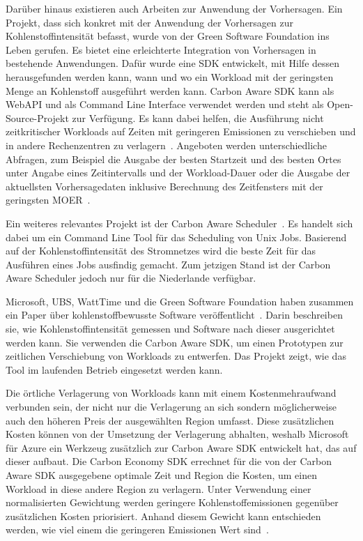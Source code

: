 Darüber hinaus existieren auch Arbeiten zur Anwendung der Vorhersagen.
Ein Projekt, dass sich konkret mit der Anwendung der Vorhersagen zur Kohlenstoffintensität befasst, wurde von der Green Software Foundation ins Leben gerufen.
Es bietet eine erleichterte Integration von Vorhersagen in bestehende Anwendungen.
Dafür wurde eine \ac{SDK} entwickelt, mit Hilfe dessen herausgefunden werden kann, wann und wo ein Workload mit der geringsten Menge an Kohlenstoff ausgeführt werden kann.
Carbon Aware \ac{SDK} kann als Web\ac{API} und als Command Line Interface verwendet werden und steht als Open-Source-Projekt zur Verfügung.
Es kann dabei helfen, die Ausführung nicht zeitkritischer Workloads auf Zeiten mit geringeren Emissionen zu verschieben und in andere Rechenzentren zu verlagern~\cite{GreenSoftwareFoundation.20231212T09:58:27.000Z}.
Angeboten werden unterschiedliche Abfragen, zum Beispiel die Ausgabe der besten Startzeit und des besten Ortes unter Angabe eines Zeitintervalls und der Workload-Dauer oder die Ausgabe der aktuellsten Vorhersagedaten inklusive Berechnung des Zeitfensters mit der geringsten \ac{MOER}~\cite{GreenSoftwareFoundation.20240316T16:54:58.000Z}.

Ein weiteres relevantes Projekt ist der Carbon Aware Scheduler~\cite{Siemers.20240319T14:09:25.000Z}.
Es handelt sich dabei um ein Command Line Tool für das Scheduling von Unix Jobs.
Basierend auf der Kohlenstoffintensität des Stromnetzes wird die beste Zeit für das Ausführen eines Jobs ausfindig gemacht.
Zum jetzigen Stand ist der Carbon Aware Scheduler jedoch nur für die Niederlande verfügbar.

Microsoft, UBS, WattTime und die Green Software Foundation haben zusammen ein Paper über kohlenstoffbewusste Software veröffentlicht~\cite{Buchanan.2023}.
Darin beschreiben sie, wie Kohlenstoffintensität gemessen und Software nach dieser ausgerichtet werden kann.
Sie verwenden die Carbon Aware \ac{SDK}, um einen Prototypen zur zeitlichen Verschiebung von Workloads zu entwerfen.
Das Projekt zeigt, wie das Tool im laufenden Betrieb eingesetzt werden kann.

Die örtliche Verlagerung von Workloads kann mit einem Kostenmehraufwand verbunden sein, der nicht nur die Verlagerung an sich sondern möglicherweise auch den höheren Preis der ausgewählten Region umfasst.
Diese zusätzlichen Kosten können von der Umsetzung der Verlagerung abhalten, weshalb Microsoft für Azure ein Werkzeug zusätzlich zur Carbon Aware \ac{SDK} entwickelt hat, das auf dieser aufbaut.
Die Carbon Economy \ac{SDK} errechnet für die von der Carbon Aware \ac{SDK} ausgegebene optimale Zeit und Region die Kosten, um einen Workload in diese andere Region zu verlagern.
Unter Verwendung einer normalisierten Gewichtung werden geringere Kohlenstoffemissionen gegenüber zusätzlichen Kosten priorisiert.
Anhand diesem Gewicht kann entschieden werden, wie viel einem die geringeren Emissionen Wert sind~\cite{Norlander.2023}.

